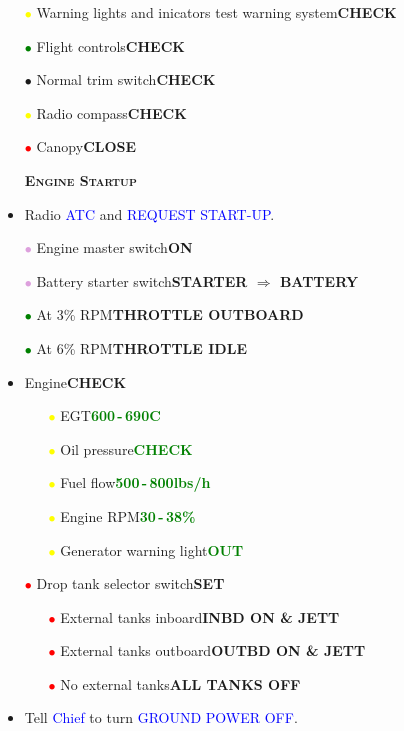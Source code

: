 \documentclass[a4paper,12pt,dvipsnames]{letter}
\newcommand{\radio}[1]{\textcolor{blue}{#1}}
\newcommand{\button}[1]{\textbf{#1}}
\newcommand{\degC}{\textdegree{}C}
\newcommand{\ok}[1]{\textcolor{Green}{\textbf{#1}}}
\newcommand{\myHead}[1]{{\LARGE\textsc{\textbf{#1}}}}
\newcommand{\ri}{\textcolor{Red}{$\bullet$\;}}
\newcommand{\gi}{\textcolor{Green}{$\bullet$\;}}
\newcommand{\yi}{\textcolor{Yellow}{$\bullet$\;}}
\newcommand{\vi}{\textcolor{Plum}{$\bullet$\;}}
\newcommand{\ai}{\textcolor{Apricot}{$\bullet$\;}}
\begin{document}
{\begin{itemize}
\item[\yi] Warning lights and inicators test warning system\dotfill\button{CHECK}
\item[\gi] Flight controls\dotfill\button{CHECK}
\item[\ai] Normal trim switch\dotfill\button{CHECK}
\item[\yi] Radio compass\dotfill\button{CHECK}
\item[\ri] Canopy\dotfill\button{CLOSE}
\end{itemize}
\newpage
\begin{itemize}
\item[] \myHead{Engine Startup}
\item Radio \radio{ATC} and \radio{REQUEST START-UP}.
\item[\vi] Engine master switch\dotfill\button{ON}
\item[\vi] Battery starter switch\dotfill\button{STARTER $\Rightarrow$ BATTERY}
\item[\gi] At 3\% RPM\dotfill\button{THROTTLE OUTBOARD}
\item[\gi] At 6\% RPM\dotfill\button{THROTTLE IDLE}
\item Engine\dotfill\button{CHECK}
\begin{itemize}
  \item[\yi] EGT\dotfill\ok{600\,-\,690\degC}
  \item[\yi] Oil pressure\dotfill\ok{CHECK}
  \item[\yi] Fuel flow\dotfill\ok{500\,-\,800\;lbs/h}
  \item[\yi] Engine RPM\dotfill\ok{30\,-\,38\%}
  \item[\yi] Generator warning light\dotfill\ok{OUT}
\end{itemize}
\item[\ri] Drop tank selector switch\dotfill\button{SET}
\begin{itemize}
  \item[\ri] External tanks inboard\dotfill\button{INBD ON \& JETT}
  \item[\ri] External tanks outboard\dotfill\button{OUTBD ON \& JETT}
  \item[\ri] No external tanks\dotfill\button{ALL TANKS OFF}
\end{itemize}
\item Tell \radio{Chief} to turn \radio{GROUND POWER OFF}.

\end{itemize}}
\end{document}

